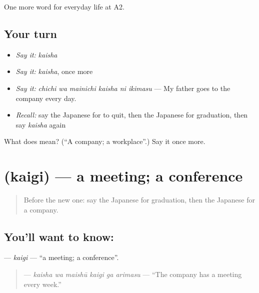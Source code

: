 \begin{grammarlens}[title={What you've built}]
One more word for everyday life at A2.
\end{grammarlens}

\subsection*{Your turn}
\begin{itemize}
\raggedright
  \item \emph{Say it:} \emph{kaisha}
  \item \emph{Say it:} \emph{kaisha}, once more
  \item \emph{Say it:} \emph{chichi wa mainichi kaisha ni ikimasu} — My father goes to the company every day.
  \item \emph{Recall:} say the Japanese for to quit, then the Japanese for graduation, then say \emph{kaisha} again
\end{itemize}

\begin{tcolorbox}[breakable,colback=teal!4,colframe=teal!35!black,title={Before you move on}]
What does  mean? (\textquotedblleft{}A company; a workplace\textquotedblright{}.) Say it once more.
\end{tcolorbox}
\section[\texorpdfstring{\ja{かいぎ} (kaigi)}{かいぎ (kaigi)}]{ (kaigi) — a meeting; a conference}

\label{lesson:JA-C229-kaigi}



\begin{quote}
Before the new one: say the Japanese for graduation, then the Japanese for a company.
\end{quote}

\subsection*{You'll want to know: }
\textbf{} — \emph{kaigi} — \textquotedblleft{}a meeting; a conference\textquotedblright{}.

\begin{quote}
\textbf{   } — \emph{kaisha wa maishū kaigi ga arimasu} — \textquotedblleft{}The company has a meeting every week.\textquotedblright{}
\end{quote}


